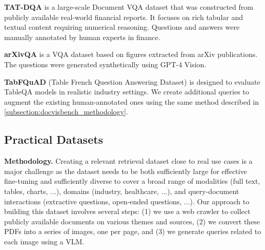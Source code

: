 \noindent\textbf{TAT-DQA}  is a large-scale Document VQA dataset that was constructed from publicly available real-world financial reports. It focuses on rich tabular and textual content requiring numerical reasoning. Questions and answers were manually annotated by human experts in finance.

\noindent\textbf{arXivQA}  is a VQA dataset based on figures extracted from arXiv publications. The questions were generated synthetically using GPT-4 Vision.

\noindent\textbf{TabFQuAD} (Table French Question Answering Dataset) is designed to evaluate TableQA models in realistic industry settings. We create additional queries to augment the existing human-annotated ones using the same method described in \autoref{subsection:docvisbench_methodology}.

\label{subsection:tabfquad}


\subsection{Practical Datasets}
\label{subsection:docvisbench_methodology}


\noindent\textbf{Methodology.} Creating a relevant retrieval dataset close to real use cases is a major challenge as the dataset needs to be both sufficiently large for effective fine-tuning and sufficiently diverse to cover a broad range of modalities (full text, tables, charts, ...), domains (industry, healthcare, ...), and query-document interactions (extractive questions, open-ended questions, ...). Our approach to building this dataset involves several steps: (1) we use a web crawler to collect publicly available documents on various themes and sources, (2) we convert these PDFs into a series of images, one per page, and (3) we generate queries related to each image using a VLM.

